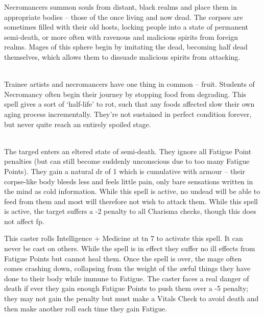 \begin{multicols}{2}

\noindent
Necromancers summon souls from distant, black realms and place them in appropriate bodies -- those of the once living and now dead. The corpses are sometimes filled with their old hosts, locking people into a state of permanent semi-death, or more often with ravenous and malicious spirits from foreign realms. Mages of this sphere begin by imitating the dead, becoming half dead themselves, which allows them to dissuade malicious spirits from attacking.

\spelllevel

\\
Trainee artists and necromancers have one thing in common -- fruit.
Students of Necromancy often begin their journey by stopping food from degrading.
This spell gives a sort of `half-life' to rot, such that any foods affected slow their own aging process incrementally.
They're not sustained in perfect condition forever, but never quite reach an entirely spoiled stage.

\\
The targed enters an eltered state of semi-death. They ignore all Fatigue Point penalties (but can still become suddenly unconscious due to too many Fatigue Points).
They gain a natural \gls{dr} of 1 which is cumulative with armour -- their corpse-like body bleeds less and feels little pain, only bare sensations written in the mind as cold information.
While this spell is active, no undead will be able to feed from them and most will therefore not wish to attack them.
While this spell is active, the target suffers a -2 penalty to all Charisma checks, though this does not affect \gls{fp}.

This caster rolls Intelligence + Medicine at \gls{tn} 7 to activate this spell. It can never be cast on others. While the spell is in effect they suffer no ill effects from Fatigue Points but cannot heal them. Once the spell is over, the mage often comes crashing down, collapsing from the weight of the awful things they have done to their body while immune to Fatigue. The caster faces a real danger of death if ever they gain enough Fatigue Points to push them over a -5 penalty; they may not gain the penalty but must make a Vitals Check to avoid death and then make another roll each time they gain Fatigue.



\end{multicols}
